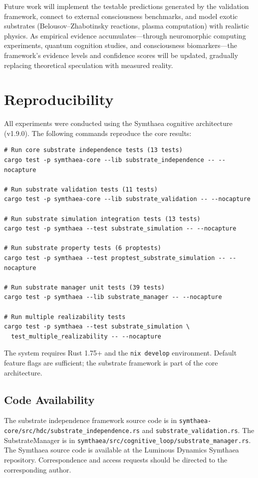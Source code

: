 \documentclass[12pt,a4paper]{article}
\begin{document}
Future work will implement the testable predictions generated by the validation framework, connect to external consciousness benchmarks, and model exotic substrates (Belousov--Zhabotinsky reactions, plasma computation) with realistic physics. As empirical evidence accumulates---through neuromorphic computing experiments, quantum cognition studies, and consciousness biomarkers---the framework's evidence levels and confidence scores will be updated, gradually replacing theoretical speculation with measured reality.

\section{Reproducibility}

All experiments were conducted using the Symthaea cognitive architecture (v1.9.0). The following commands reproduce the core results:

\begin{verbatim}
# Run core substrate independence tests (13 tests)
cargo test -p symthaea-core --lib substrate_independence -- --nocapture

# Run substrate validation tests (11 tests)
cargo test -p symthaea-core --lib substrate_validation -- --nocapture

# Run substrate simulation integration tests (13 tests)
cargo test -p symthaea --test substrate_simulation -- --nocapture

# Run substrate property tests (6 proptests)
cargo test -p symthaea --test proptest_substrate_simulation -- --nocapture

# Run substrate manager unit tests (39 tests)
cargo test -p symthaea --lib substrate_manager -- --nocapture

# Run multiple realizability tests
cargo test -p symthaea --test substrate_simulation \
  test_multiple_realizability -- --nocapture
\end{verbatim}

The system requires Rust 1.75+ and the \texttt{nix develop} environment. Default feature flags are sufficient; the substrate framework is part of the core architecture.

\subsection*{Code Availability}

The substrate independence framework source code is in \texttt{symthaea-core/src/hdc/substrate\_independence.rs} and \texttt{substrate\_validation.rs}. The SubstrateManager is in \texttt{symthaea/src/cognitive\_loop/substrate\_manager.rs}. The Symthaea source code is available at the Luminous Dynamics Symthaea repository. Correspondence and access requests should be directed to the corresponding author.
\end{document}
